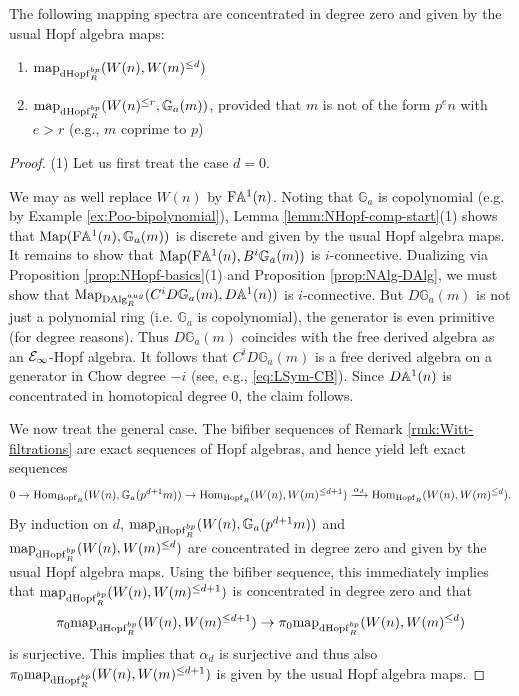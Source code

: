 \documentclass{amsart}
\numberwithin{proposition}{section}
\numberwithin{equation}{section}
\def\Hopf{\mathrm{Hopf}}
\def\dHopf{\mathrm{dHopf}}
\def\Hopf{\mathrm{Hopf}}
\def\DAlg{\mathrm{DAlg}}
\newcommand{\Ga}{{\mathbb{G}_a}}
\def\Free{\mathrm{F}}
\begin{document}
\begin{lemma} \label{lemm:Wled-rep}
The following mapping spectra are concentrated in degree zero and given by the usual Hopf algebra maps:
\begin{enumerate}
\item $\map_{\dHopf_R^{bp}}(W(n), W(m)^{\le d})$
\item $\map_{\dHopf_R^{bp}}(W(n)^{\le r}, \Ga(m))$, provided that $m$ is not of the form $p^en$ with $e > r$ (e.g., $m$ coprime to $p$)
\end{enumerate}
\end{lemma}
\begin{proof}
(1) Let us first treat the case $d=0$.

We may as well replace $W(n)$ by $\Free\A^1(n)$.
Noting that $\Ga$ is copolynomial (e.g. by Example \ref{ex:Poo-bipolynomial}), Lemma \ref{lemm:NHopf-comp-start}(1) shows that $\Map(\Free\A^1(n), \Ga(m))$ is discrete and given by the usual Hopf algebra maps.
It remains to show that $\Map(\Free\A^1(n), B^i \Ga(m))$ is $i$-connective.
Dualizing via Proposition \ref{prop:NHopf-basics}(1) and Proposition \ref{prop:NAlg-DAlg}, we must show that $\Map_{\DAlg_R^{aug}}(C^i D\Ga(m), D\A^1(n))$ is $i$-connective.
But $D\Ga(m)$ is not just a polynomial ring (i.e. $\Ga$ is copolynomial), the generator is even primitive (for degree reasons).
Thus $D\Ga(m)$ coincides with the free derived algebra as an $\mathcal E_\infty$-Hopf algebra.
It follows that $C^i D\Ga(m)$ is a free derived algebra on a generator in Chow degree $-i$ (see, e.g., \eqref{eq:LSym-CB}).
Since $D\mathbb A^1(n)$ is concentrated in homotopical degree $0$, the claim follows.

We now treat the general case.
The bifiber sequences of Remark \ref{rmk:Witt-filtrations} are exact sequences of Hopf algebras, and hence yield left exact sequences \[ 0 \to \Hom_{\Hopf_R}(W(n), \Ga(p^{d+1}m)) \to \Hom_{\Hopf_R}(W(n), W(m)^{\le d+1}) \xrightarrow{\alpha_d} \Hom_{\Hopf_R}(W(n), W(m)^{\le d}). \]
By induction on $d$, $\map_{\dHopf_R^{bp}}(W(n), \Ga(p^{d+1}m))$ and $\map_{\dHopf_R^{bp}}(W(n), W(m)^{\le d})$ are concentrated in degree zero and given by the usual Hopf algebra maps.
Using the bifiber sequence, this immediately implies that $\map_{\dHopf_R^{bp}}(W(n), W(m)^{\le d+1})$ is concentrated in degree zero and that \[ \pi_0\map_{\dHopf_R^{bp}}(W(n), W(m)^{\le d+1}) \to \pi_0\map_{\dHopf_R^{bp}}(W(n), W(m)^{\le d}) \] is surjective.
This implies that $\alpha_d$ is surjective and thus also $\pi_0 \map_{\dHopf_R^{bp}}(W(n), W(m)^{\le d+1})$ is given by the usual Hopf algebra maps.


\end{proof}
\end{document}
